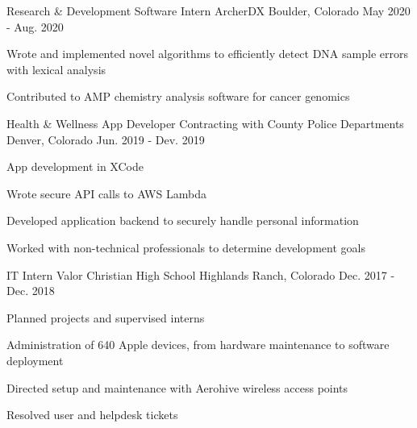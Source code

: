 \begin{cventries}
  \cventry
    {Research \& Development Software Intern}
    {ArcherDX}
    {Boulder, Colorado}
    {May 2020 - Aug. 2020}
    {
      \begin{cvitems}
        \item {Wrote and implemented novel algorithms to efficiently detect DNA sample errors with lexical analysis}
        \item {Contributed to AMP chemistry analysis software for cancer genomics}
      \end{cvitems}
    }

  \cventry
    {Health \& Wellness App Developer}
    {Contracting with County Police Departments}
    {Denver, Colorado}
    {Jun. 2019 - Dev. 2019}
    {
      \begin{cvitems}
        \item {App development in XCode}
        \item {Wrote secure API calls to AWS Lambda}
        \item {Developed application backend to securely handle personal information}
        \item {Worked with non-technical professionals to determine development goals}
      \end{cvitems}
    }

  \cventry
    {IT Intern}
    {Valor Christian High School}
    {Highlands Ranch, Colorado}
    {Dec. 2017 - Dec. 2018}
    {
      \begin{cvitems}
        \item {Planned projects and supervised interns}
        \item {Administration of 640 Apple devices, from hardware maintenance to software deployment}
        \item {Directed setup and maintenance with Aerohive wireless access points}
        \item {Resolved user and helpdesk tickets}
      \end{cvitems}
    }

\end{cventries}
